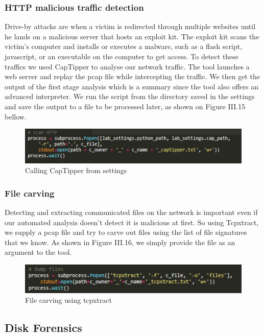 \subsubsection{HTTP malicious traffic detection}
Drive-by attacks are when a victim is redirected through multiple websites until he lands on a malicious server that hosts an exploit kit. The exploit kit scans the victim's computer and installs or executes a malware, such as a flash script, javascript, or an executable on the computer to get access. To detect these traffics we used CapTipper\cite{captipper} to analyse our network traffic. The tool launches a web server and replay the pcap file while intercepting the traffic. We then get the output of the first stage analysis which is a summary since the tool also offers an advanced interpreter. We run the script from the directory saved in the settings and save the output to a file to be processed later, as shown on Figure III.15 bellow.
\begin{figure}[H]
\centering
\includegraphics[width=0.8\columnwidth]{Figures/http.png}
\caption{Calling CapTipper from settings}
\end{figure}

\subsubsection{File carving}
Detecting and extracting communicated files on the network is important even if our automated analysis doesn't detect it is malicious at first. So using Tcpxtract, we supply a pcap file and try to carve out files using the list of file signatures that we know. As shown in Figure III.16, we simply provide the file as an argument to the tool.
\begin{figure}[H]
\centering
\includegraphics[width=0.8\columnwidth]{Figures/tcpx.png}
\caption{File carving using tcpxtract}
\end{figure}

\subsection{Disk Forensics}
